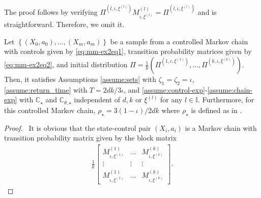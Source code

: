 \documentclass[opre,sglanonrev]{informs4}
\numberwithin{equation}{section}
\newcommand{\pow}[1]{^{(#1)}}
\newcommand{\lp}{\left(}
\newcommand{\rp}{\right)}
\newcommand{\Cbb}{\mathbb{C}}
\newcommand{\Ibb}{\mathbb{I}}
\newcommand{\constant}{\Cbb}
\newcommand{\indexeddata}{\left\{(X_0,a_0),\dots,(X_m,a_m)\right\}}
\begin{document}
\begin{APPENDICES}
{\noindent The proof follows by verifying $\Pi\pow{l,\iota,\xi\pow{l}}M_{\iota,\xi^{(l)}}^{(l)}=\Pi\pow{l,\iota,\xi\pow{l}}$ and is straightforward. Therefore, we omit it.
\begin{proposition}\label{prop:mm-ex2prop1}
Let $\indexeddata$ be a sample from a controlled Markov chain with controls given by \cref{eq:mm-ex2eq1}, transition probability matrices given by \cref{eq:mm-ex2eq2}, and initial distribution $\Pi = \frac{1}{k}\lp\Pi\pow{1,\iota,\xi\pow{1}},\dots,\Pi\pow{k,\iota,\xi\pow{k}}\rp$. 
Then, it satisfies Assumptions \ref{assume:sets} with $\zeta_1=\zeta_2=\iota$, \ref{assume:return_time} with $T = 2dk/3\iota$, and \ref{assume:control-exp}-\ref{assume:chain-exp} with $\constant_\star$ and $\constant_{\theta,\star}$ independent of $d,k$ or $\xi\pow{l}$ for any $l\in\Ibb$. Furthermore, for this controlled Markov chain, $\rho_\star = 3(1-\iota)/2dk$ where $\rho_\star$ is defined as in .
\end{proposition}
\begin{proof} \ 
It is obvious that the state-control pair $(X_i,a_i)$ is a Markov chain with transition probability matrix given by the block matrix
\begin{align*}
 \frac{1}{k}\begin{bmatrix}
    M_{\iota,\xi^{(1)}}^{(1)}&\dots&M_{\iota,\xi^{(k)}}^{(k)}\\
    \vdots& \vdots & \vdots\\
     M_{\iota,\xi^{(1)}}^{(1)}&\dots&M_{\iota,\xi^{(k)}}^{(k)}
   \end{bmatrix}.
\end{align*}


\end{proof}}
\end{APPENDICES}
\end{document}
